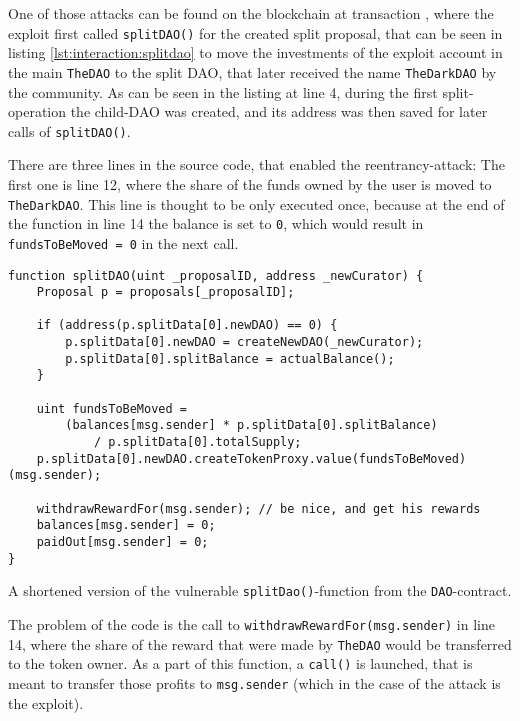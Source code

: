 One of those attacks can be found on the blockchain at transaction \cite{etherscan:dao:oneoftheattacks}, where the exploit first called \texttt{splitDAO()} for the created split proposal, that can be seen in listing \ref{lst:interaction:splitdao} to move the investments of the exploit account in the main \texttt{TheDAO} to the split DAO, that later received the name \texttt{TheDarkDAO} by the community. As can be seen in the listing at line 4, during the first split-operation the child-DAO was created, and its address was then saved for later calls of \texttt{splitDAO()}.

There are three lines in the source code, that enabled the reentrancy-attack: The first one is line 12, where the share of the funds owned by the user is moved to \texttt{TheDarkDAO}. This line is thought to be only executed once, because at the end of the function in line 14 the balance is set to \texttt{0}, which would result in \texttt{fundsToBeMoved = 0} in the next call.

\begin{listing}[H]
	\begin{verbatim}
function splitDAO(uint _proposalID, address _newCurator) {
    Proposal p = proposals[_proposalID];

    if (address(p.splitData[0].newDAO) == 0) {
        p.splitData[0].newDAO = createNewDAO(_newCurator);
        p.splitData[0].splitBalance = actualBalance();
    }

    uint fundsToBeMoved =
        (balances[msg.sender] * p.splitData[0].splitBalance)
            / p.splitData[0].totalSupply;
    p.splitData[0].newDAO.createTokenProxy.value(fundsToBeMoved)(msg.sender);

    withdrawRewardFor(msg.sender); // be nice, and get his rewards
    balances[msg.sender] = 0;
    paidOut[msg.sender] = 0;
}
    \end{verbatim}
	\caption{A shortened version of the vulnerable \texttt{splitDao()}-function from the \texttt{DAO}-contract.}
	\label{lst:interaction:splitdao}
\end{listing}

The problem of the code is the call to \texttt{withdrawRewardFor(msg.sender)} in line 14, where the share of the reward that were made by \texttt{TheDAO} would be transferred to the token owner. As a part of this function, a \texttt{call()} is launched, that is meant to transfer those profits to \texttt{msg.sender} (which in the case of the attack is the exploit).

